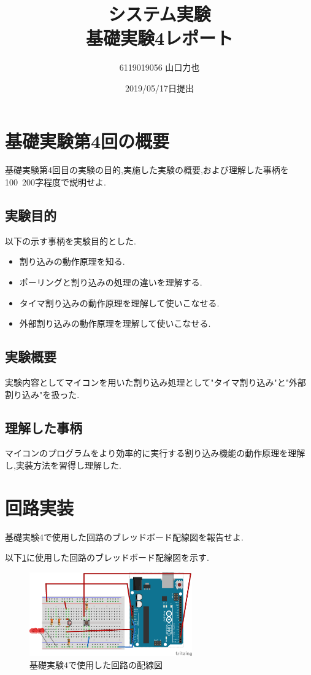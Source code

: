 \documentclass{jarticle}
\title{{システム実験}\\基礎実験4レポート}
\author{6119019056 山口力也}
\date{2019/05/17日提出}
\begin{document}
\maketitle
\section{基礎実験第4回の概要}
基礎実験第4回目の実験の目的,実施した実験の概要,および理解した事柄を100~200字程度で説明せよ.

\subsection{実験目的}
以下の示す事柄を実験目的とした.

\begin{itemize}

\item 割り込みの動作原理を知る.
\item ポーリングと割り込みの処理の違いを理解する.
\item タイマ割り込みの動作原理を理解して使いこなせる.
\item 外部割り込みの動作原理を理解して使いこなせる.

\end{itemize}

\subsection{実験概要}
実験内容としてマイコンを用いた割り込み処理として"タイマ割り込み"と"外部割り込み"を扱った.

\subsection{理解した事柄}
マイコンのプログラムをより効率的に実行する割り込み機能の動作原理を理解し,実装方法を習得し理解した.

\section{回路実装}
基礎実験4で使用した回路のブレッドボード配線図を報告せよ.

以下\ref{fig:bread}に使用した回路のブレッドボード配線図を示す.

\begin{figure}[H]
\begin{center}
\includegraphics[width=7.0cm]{images/bread.png}
\caption{基礎実験4で使用した回路の配線図}
\label{fig:bread}
\end{center}
\end{figure}
\end{document}
